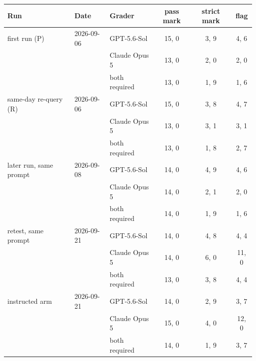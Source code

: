 \begingroup\scriptsize\setlength{\tabcolsep}{4pt}
\begin{tabular}{@{}lllccc@{}}
\toprule
Run & Date & Grader & pass mark & strict mark & flag \\
\midrule
first run (P) & 2026-09-06 & GPT-5.6-Sol & 15, 0 & 3, 9 & 4, 6 \\
 &  & Claude Opus 5 & 13, 0 & 2, 0 & 2, 0 \\
 &  & both required & 13, 0 & 1, 9 & 1, 6 \\
\midrule
same-day re-query (R) & 2026-09-06 & GPT-5.6-Sol & 15, 0 & 3, 8 & 4, 7 \\
 &  & Claude Opus 5 & 13, 0 & 3, 1 & 3, 1 \\
 &  & both required & 13, 0 & 1, 8 & 2, 7 \\
\midrule
later run, same prompt & 2026-09-08 & GPT-5.6-Sol & 14, 0 & 4, 9 & 4, 6 \\
 &  & Claude Opus 5 & 14, 0 & 2, 1 & 2, 0 \\
 &  & both required & 14, 0 & 1, 9 & 1, 6 \\
\midrule
retest, same prompt & 2026-09-21 & GPT-5.6-Sol & 14, 0 & 4, 8 & 4, 4 \\
 &  & Claude Opus 5 & 14, 0 & 6, 0 & 11, 0 \\
 &  & both required & 13, 0 & 3, 8 & 4, 4 \\
\midrule
instructed arm & 2026-09-21 & GPT-5.6-Sol & 14, 0 & 2, 9 & 3, 7 \\
 &  & Claude Opus 5 & 15, 0 & 4, 0 & 12, 0 \\
 &  & both required & 14, 0 & 1, 9 & 3, 7 \\
\bottomrule
\end{tabular}
\endgroup
